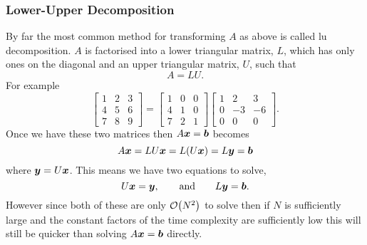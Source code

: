 \documentclass[a4paper]{article}
\begin{document}
    \subsubsection{Lower-Upper Decomposition}
    By far the most common method for transforming \(A\) as above is called \gls{lu} decomposition.
    \(A\) is factorised into a lower triangular matrix, \(L\), which has only ones on the diagonal and an upper triangular matrix, \(U\), such that
    \[A = LU.\]
    For example
    \[
        \begin{bmatrix}
            1 & 2 & 3\\
            4 & 5 & 6\\
            7 & 8 & 9
        \end{bmatrix}
        =
        \begin{bmatrix}
            1 & 0 & 0\\
            4 & 1 & 0\\
            7 & 2 & 1
        \end{bmatrix}
        \begin{bmatrix}
            1 & 2 & 3\\
            0 & -3 & -6\\
            0 & 0 & 0
        \end{bmatrix}
        .
    \]
    Once we have these two matrices then \(A\bm{x} = \bm{b}\) becomes 
    \[A\bm{x} = LU\bm{x} = L(U\bm{x}) = L\bm{y} = \bm{b}\]
    where \(\bm{y} = U\bm{x}\).
    This means we have two equations to solve,
    \[U\bm{x} = \bm{y},\qquad\text{and}\qquad L\bm{y} = \bm{b}.\]
    However since both of these are only \(\order{N^2}\) to solve then if \(N\) is sufficiently large and the constant factors of the time complexity are sufficiently low this will still be quicker than solving \(A\bm{x} = \bm{b}\) directly.
    
\end{document}
